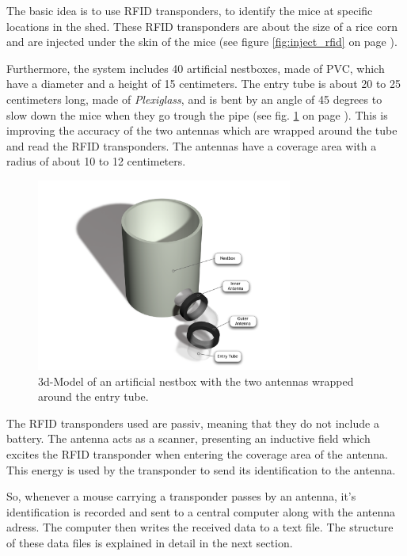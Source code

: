 The basic idea is to use \acf{RFID} transponders, to identify the mice at specific locations in the shed. These \ac{RFID} transponders are about the size of a rice corn and are injected under the skin of the mice (see figure \ref{fig:inject_rfid} on page \pageref{fig:inject_rfid}). 

Furthermore, the system includes 40 artificial nestboxes, made of \ac{PVC}, which have a diameter and a height of 15 centimeters. The entry tube is about 20 to 25 centimeters long, made of \textit{Plexiglass}, and is bent by an angle of 45 degrees to slow down the mice when they go trough the pipe (see fig. \ref{fig:artNestbox} on page \pageref{fig:artNestbox}). This is improving the accuracy of the two antennas which are wrapped around the tube and read the RFID transponders. The antennas have a coverage area with a radius of about 10 to 12 centimeters.
 
\begin{figure}[htbp]	
\centering	
\includegraphics[width=0.75\textwidth]{assets/pdf/box_schema.pdf}	
\caption[Model of an artificial nestbox]{3d-Model of an artificial nestbox with the two antennas wrapped around the entry tube.}
\label{fig:artNestbox}
\end{figure}

The \ac{RFID} transponders used are passiv, meaning that they do not include a battery. The antenna acts as a scanner, presenting an inductive field which excites the \ac{RFID} transponder when entering the coverage area of the antenna. This energy is used by the transponder to send its identification to the antenna. 

So, whenever a mouse carrying a transponder passes by an antenna, it's identification is recorded and sent to a central computer along with the antenna adress. The computer then writes the received data to a text file. The structure of these data files is explained in detail in the next section.

